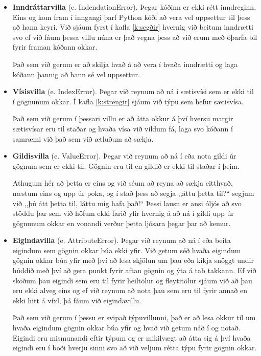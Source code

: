 \begin{itemize}[leftmargin=*]
	\item \textbf{Inndráttarvilla} (e. IndendationError).
	Þegar kóðinn er ekki rétt inndreginn.
	Eins og kom fram í inngangi þarf Python kóði að vera vel uppsettur til þess að hann keyri.
	Við sjáum fyrst í kafla \ref{k:segðir} hvernig við beitum inndrætti svo ef við fáum þessa villu núna er það vegna þess að við erum með óþarfa bil fyrir framan kóðann okkar.
	
	Það sem við gerum er að skilja hvað á að vera í hvaða inndrætti og laga kóðann þannig að hann sé vel uppsettur.
	
	\item \textbf{Vísisvilla} (e. IndexError).
	Þegar við reynum að ná í sætisvísi sem er ekki til í gögnunum okkar.
	Í kafla \ref{k:strengir} sjáum við týpu sem hefur sætisvísa.
	
	Það sem við gerum í þessari villu er að átta okkur á því hversu margir sætisvísar eru til staðar og hvaða vísa við vildum fá, laga svo kóðann í samræmi við það sem við ætluðum að sækja.
	
	\item \textbf{Gildisvilla} (e. ValueError).
	Þegar við reynum að ná í eða nota gildi úr gögnum sem er ekki til.
	Gögnin eru til en gildið er ekki til staðar í þeim.
	
	Athugum hér að þetta er eins og við séum að reyna að sækja eitthvað, næstum eins og upp úr poka, og í stað þess að segja ,,áttu þetta til?“ segjum við ,,þú átt þetta til, láttu mig hafa það!“ Þessi lausn er ansi óljós að svo stöddu þar sem við höfum ekki farið yfir hvernig á að ná í gildi upp úr gögnunum okkar en vonandi verður þetta ljósara þegar þar að kemur.
	
	\item \textbf{Eigindavilla} (e. AttributeError).
	Þegar við reynum að ná í eða beita eigindum sem gögnin okkar búa ekki yfir.
	Við getum séð hvaða eigindum gögnin okkar búa yfir með því að lesa skjölun um þau eða kíkja snöggt undir húddið með því að gera punkt fyrir aftan gögnin og ýta á tab takkann.
	Ef við skoðum þau eigindi sem eru til fyrir heiltölur og fleytitölur sjáum við að þau eru ekki alveg eins og ef við reynum að nota þau sem eru til fyrir annað en ekki hitt á víxl, þá fáum við eigindavillu.
	
	Það sem við gerum í þessu er svipað týpuvillunni, það er að lesa okkur til um hvaða eigindum gögnin okkar búa yfir og hvað við getum náð í og notað.
	Eigindi eru mismunandi eftir týpum og er mikilvægt að átta sig á því hvaða eigindi eru í boði hverju sinni svo að við veljum rétta týpu fyrir gögnin okkar.
\end{itemize}


